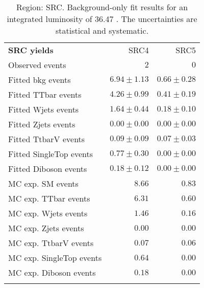 

\begin{table}
\begin{center}
\setlength{\tabcolsep}{0.0pc}
{\small
\begin{tabular*}{\textwidth}{@{\extracolsep{\fill}}lrr}
\noalign{\smallskip}\hline\noalign{\smallskip}
{\bf SRC yields}           & SRC4            & SRC5              \\[-0.05cm]
\noalign{\smallskip}\hline\noalign{\smallskip}
Observed events          & $2$              & $0$                    \\
\noalign{\smallskip}\hline\noalign{\smallskip}
Fitted bkg events         & $6.94 \pm 1.13$          & $0.66 \pm 0.28$              \\
\noalign{\smallskip}\hline\noalign{\smallskip}
        Fitted TTbar events         & $4.26 \pm 0.99$          & $0.41 \pm 0.19$              \\
        Fitted Wjets events         & $1.64 \pm 0.44$          & $0.18 \pm 0.10$              \\
        Fitted Zjets events         & $0.00 \pm 0.00$          & $0.00 \pm 0.00$              \\
        Fitted TtbarV events         & $0.09 \pm 0.09$          & $0.07 \pm 0.03$              \\
        Fitted SingleTop events         & $0.77 \pm 0.30$          & $0.00 \pm 0.00$              \\
        Fitted Diboson events         & $0.18 \pm 0.12$          & $0.00 \pm 0.00$              \\
 \noalign{\smallskip}\hline\noalign{\smallskip}
MC exp. SM events              & $8.66$          & $0.83$              \\
\noalign{\smallskip}\hline\noalign{\smallskip}
        MC exp. TTbar events         & $6.31$          & $0.60$              \\
        MC exp. Wjets events         & $1.46$          & $0.16$              \\
        MC exp. Zjets events         & $0.00$          & $0.00$              \\
        MC exp. TtbarV events         & $0.07$          & $0.06$              \\
        MC exp. SingleTop events         & $0.64$          & $0.00$              \\
        MC exp. Diboson events         & $0.18$          & $0.00$              \\
\noalign{\smallskip}\hline\noalign{\smallskip}
\end{tabular*}
}
\end{center}
\caption{Region: SRC. Background-only fit results for an integrated luminosity of 36.47 \ifb. The uncertainties are statistical and systematic.
}
\label{table.bkgonly.SRC4to5}
\end{table}
%
